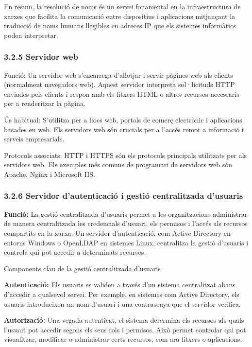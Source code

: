 \documentclass[
  a4paper,
]{article}
\begin{document}
En resum, la resolució de noms és un servei fonamental en la
infraestructura de xarxes que facilita la comunicació entre dispositius
i aplicacions mitjançant la traducció de noms humans llegibles en
adreces IP que els sistemes informàtics poden interpretar.

\subsubsection{3.2.5 Servidor web}\label{servidor-web}

Funció: Un servidor web s'encarrega d'allotjar i servir pàgines web als
clients (normalment navegadors web). Aquest servidor interpreta
sol·licituds HTTP enviades pels clients i respon amb els fitxers HTML o
altres recursos necessaris per a renderitzar la pàgina.

Ús habitual: S'utilitza per a llocs web, portals de comerç electrònic i
aplicacions basades en web. Els servidors web són crucials per a l'accés
remot a informació i serveis empresarials.

Protocols associats: HTTP i HTTPS són els protocols principals
utilitzats per als servidors web. Els exemples més comuns de programari
de servidors web són Apache, Nginx i Microsoft IIS.

\subsubsection{3.2.6 Servidor d'autenticació i gestió centralitzada
d'usuaris}\label{servidor-dautenticaciuxf3-i-gestiuxf3-centralitzada-dusuaris}

\textbf{Funció:} La gestió centralitzada d'usuaris permet a les
organitzacions administrar de manera centralitzada les credencials
d'usuari, els permisos i l'accés als recursos compartits en la xarxa. Un
servidor d'autenticació, com Active Directory en entorns Windows o
OpenLDAP en sistemes Linux, centralitza la gestió d'usuaris i controla
qui pot accedir a determinats recursos.

Components clau de la gestió centralitzada d'usuaris

\textbf{Autenticació:} Els usuaris es validen a través d'un sistema
centralitzat abans d'accedir a qualsevol servei. Per exemple, en
sistemes com Active Directory, els usuaris introdueixen un nom d'usuari
i una contrasenya que el servidor verifica.

\textbf{Autorizació:} Una vegada autenticat, el sistema determina els
recursos als quals l'usuari pot accedir segons els seus rols i permisos.
Això permet controlar qui pot visualitzar, modificar o administrar certs
recursos, com ara fitxers o aplicacions.
\end{document}
